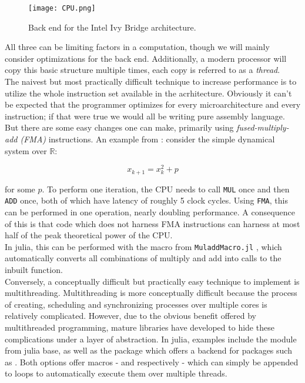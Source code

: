 \begin{figure}[ht]
    \texttt{[image: CPU.png]}
    \centering
    \caption{\cite*{solvercomp} Back end for the Intel Ivy Bridge architecture.}
    \label{fig:CPU}
\end{figure}

All three can be limiting factors in a computation, though we will mainly consider 
optimizations for the back end. Additionally, a modern processor will copy this basic 
structure multiple times, each copy is referred to as a \emph{thread}. \\

The naivest but most practically difficult technique to increase performance is to utilize 
the whole instruction set available in the acrhitecture. Obviously it can't be expected 
that the programmer optimizes for every microarchitecture and every instruction; if that were 
true we would all be writing pure assembly language. But there are some easy changes one 
can make, primarily using \emph{fused-multiply-add (FMA)} instructions. An example from 
\cite*{solvercomp}: consider the simple dynamical system over $\mathbb{R}$:

\begin{equation}{}
    x_{k+1} = x_k^2 + p
\end{equation}

for some $p$. To perform one iteration, the CPU needs to call \texttt{MUL} once and then 
\texttt{ADD} once, both of which have latency of roughly 5 clock cycles. Using 
\texttt{FMA}, this can be performed in one operation, nearly doubling performance. A 
consequence of this is that code which does not harness FMA instructions can harness at 
most half of the peak theoretical power of the CPU. \\

In julia, this can be performed with the  macro from \texttt{MuladdMacro.jl} 
\cite*{muladd}, which automatically converts all combinations of multiply and add into 
calls to the inbuilt  function. \\

Conversely, a conceptually difficult but practically easy technique to implement is 
multithreading. Multithreading is more conceptually difficult because the process of 
creating, scheduling and synchronizing processes over multiple cores is relatively 
complicated. However, due to the obvious benefit offered by multithreaded programming, 
mature libraries have developed to hide these complications under a layer of abstraction. 
In julia, examples include the  module from julia base, as well as the 
package  \cite*{transducers} which offers a backend for packages 
such as  \cite*{floops}. Both options offer macros - 
 and  respectively - which can simply be appended to 
 loops to automatically execute them over multiple threads. \\

